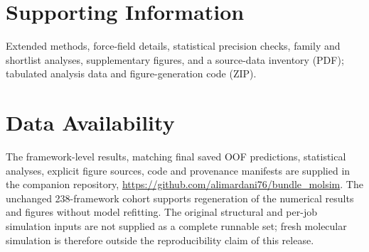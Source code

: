 \documentclass[journal=jctcce,manuscript=article]{achemso}
\begin{document}
\section*{Supporting Information}
Extended methods, force-field details, statistical precision checks, family and shortlist analyses, supplementary figures, and a source-data inventory (PDF); tabulated analysis data and figure-generation code (ZIP).

\section*{Data Availability}
The framework-level results, matching final saved OOF predictions, statistical analyses, explicit figure sources, code and provenance manifests are supplied in the companion repository, \url{https://github.com/alimardani76/bundle_molsim}. The unchanged 238-framework cohort supports regeneration of the numerical results and figures without model refitting. The original structural and per-job simulation inputs are not supplied as a complete runnable set; fresh molecular simulation is therefore outside the reproducibility claim of this release.

\end{document}
